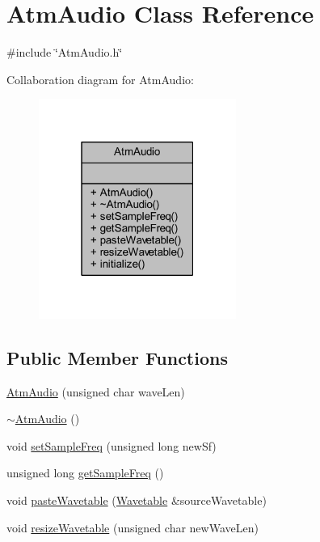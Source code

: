 \hypertarget{class_atm_audio}{}\section{Atm\+Audio Class Reference}
\label{class_atm_audio}


{\ttfamily \#include \char`\"{}Atm\+Audio.\+h\char`\"{}}



Collaboration diagram for Atm\+Audio\+:
\nopagebreak
\begin{figure}[H]
\begin{center}
\leavevmode
\includegraphics[width=183pt]{d7/dc2/class_atm_audio__coll__graph}
\end{center}
\end{figure}
\subsection*{Public Member Functions}
\begin{DoxyCompactItemize}
\item 
\hyperlink{class_atm_audio_adef4ded5a0c213fe421025e17de0605e}{Atm\+Audio} (unsigned char wave\+Len)
\item 
\hyperlink{class_atm_audio_ad4d285853a6790f23fd8dd24998a830b}{$\sim$\+Atm\+Audio} ()
\item 
void \hyperlink{class_atm_audio_ab27c4dabb9e47a386de693b47422bb2a}{set\+Sample\+Freq} (unsigned long new\+Sf)
\item 
unsigned long \hyperlink{class_atm_audio_a9336911a6a8dd22d4030b0457270c242}{get\+Sample\+Freq} ()
\item 
void \hyperlink{class_atm_audio_a3944db83a92a88144603c78b0260463a}{paste\+Wavetable} (\hyperlink{class_wavetable}{Wavetable} \&source\+Wavetable)
\item 
void \hyperlink{class_atm_audio_ab634d78d1e88550a4ed0ff1d93ed2d97}{resize\+Wavetable} (unsigned char new\+Wave\+Len)
\end{DoxyCompactItemize}
